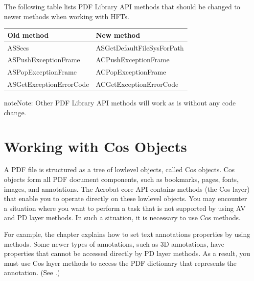 \documentclass[letterpaper,12pt,english,openany,oneside]{sphinxmanual}
\begin{document}
The following table lists PDF Library API methods that should be changed to newer methods when working with HFTs.


\begin{savenotes}\sphinxattablestart
\centering
{}\label{\detokenize{Plugins_Hft:section-3}}\nobreak
\begin{tabulary}{\linewidth}[t]{|T|T|}
\hline
\sphinxstyletheadfamily 
Old method
&\sphinxstyletheadfamily 
New method
\\
\hline
ASSecs
&
ASGetDefaultFileSysForPath
\\
\hline
ASPushExceptionFrame
&
ACPushExceptionFrame
\\
\hline
ASPopExceptionFrame
&
ACPopExceptionFrame
\\
\hline
ASGetExceptionErrorCode
&
ACGetExceptionErrorCode
\\
\hline
\end{tabulary}
\par
\sphinxattableend\end{savenotes}

\begin{sphinxadmonition}{note}{Note:}
Other PDF Library API methods will work as is without any code change.
\end{sphinxadmonition}


\chapter{Working with Cos Objects}
\label{\detokenize{Plugins_Cos:working-with-cos-objects}}\label{\detokenize{Plugins_Cos::doc}}
A PDF file is structured as a tree of low\sphinxhyphen{}level objects, called Cos objects. Cos objects form all PDF document components, such as bookmarks, pages, fonts, images, and annotations. The Acrobat core API contains methods (the Cos layer) that enable you to operate directly on these low\sphinxhyphen{}level objects. You may encounter a situation where you want to perform a task that is not supported by using AV and PD layer methods. In such a situation, it is necessary to use Cos methods.

For example, the  chapter explains how to set text annotations properties by using  methods. Some newer types of annotations, such as 3D annotations, have properties that cannot be accessed directly by PD layer methods. As a result, you must use Cos layer methods to access the PDF dictionary that represents the annotation. (See .)
\end{document}
